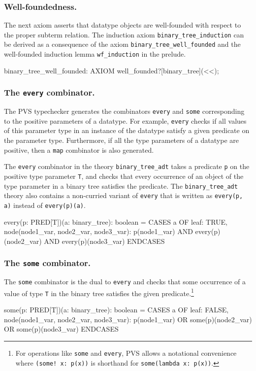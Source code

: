 \documentclass[11pt,twoside]{book}
\begin{document}
\subsubsection{Well-foundedness. } The next axiom asserts that
datatype objects are well-founded with respect to the proper subterm
relation.  The induction axiom \texttt{binary\_tree\_induction} can be
derived as a consequence of the axiom \texttt{binary\_tree\_well\_founded}
and the well-founded induction lemma \texttt{wf\_induction} in the prelude.
\begin{session*}
  binary_tree_well_founded: AXIOM well_founded?[binary_tree](<<);
\end{session*}

\subsubsection{The \texttt{every} combinator. }
The PVS typechecker generates the combinators \texttt{every} and \texttt{some}
corresponding to the positive parameters of a datatype.
For example, \texttt{every}  checks if all values of this parameter type in
an instance of the datatype satisfy 
a given predicate on the parameter type.  Furthermore, if all the type
parameters of a datatype are positive, then a \texttt{map} combinator is also
generated.  

The \texttt{every} combinator in the
theory  
\texttt{binary\_tree\_adt} takes a predicate  \texttt{p} on
the positive type parameter \texttt{T}, and checks that every occurrence of an
object of the type parameter in a binary tree satisfies the predicate.
The \texttt{binary\_tree\_adt} theory also contains a non-curried variant of
\texttt{every} that is 
written as \texttt{every(p, a)} instead of \texttt{every(p)(a)}\@.  
\begin{session*}
  every(p: PRED[T])(a: binary_tree): boolean =
    CASES a OF
      leaf: TRUE,
      node(node1_var, node2_var, node3_var):
          p(node1_var)
            AND every(p)(node2_var) AND every(p)(node3_var)
      ENDCASES
 \end{session*}

\subsubsection{The \texttt{some} combinator. } The \texttt{some} combinator is the
dual to \texttt{every} and checks that 
some occurrence of a value of type \texttt{T} in the binary tree
satisfies the given predicate.\footnote{For operations like \texttt{some} and
\texttt{every}, PVS allows a notational convenience where
\texttt{(some!\ x:\ p(x))} is shorthand for \texttt{some(lambda\ x:\ p(x))}\@. }
\begin{session*}
  some(p: PRED[T])(a: binary_tree): boolean =
    CASES a OF
      leaf: FALSE,
      node(node1_var, node2_var, node3_var):
          p(node1_var) OR some(p)(node2_var) OR some(p)(node3_var)
      ENDCASES
\end{session*}
\end{document}
